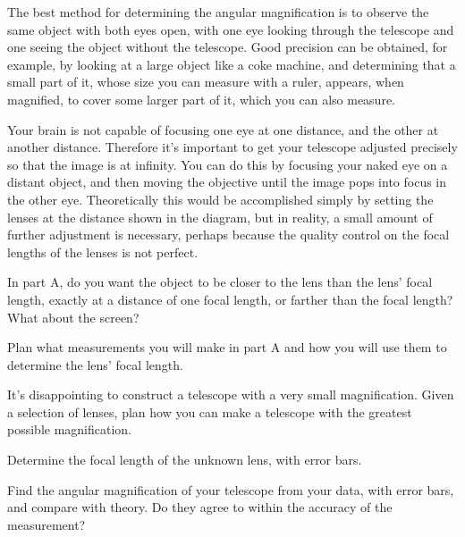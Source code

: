 The best method for determining the angular magnification
is to observe the same object with both eyes open, with one
eye looking through the telescope and one seeing the object
without the telescope. Good precision can be obtained, for
example, by looking at a large object like a coke machine,
and determining that a small part of it, whose size you
can measure with a ruler, appears, when magnified, to cover some larger part
of it, which you can also measure. 

Your brain is not capable of focusing one eye at one distance, and
the other at another distance. Therefore it's important to get your
telescope adjusted precisely so that the image is at infinity.
You can do this by focusing your naked eye on a distant object, and
then moving the objective until the image pops into focus in the
other eye. Theoretically this would be accomplished simply by setting
the lenses at the distance shown in the diagram, but in reality,
a small amount of further adjustment is necessary, perhaps because
the quality control on the focal lengths of the lenses is not perfect.


\prelab

\lasersafety

\prelabquestion  In part A, do you want the object to be closer to the
lens than the lens' focal length, exactly at a distance of
one focal length, or farther than the focal length?
What about the screen?

\prelabquestion  Plan what measurements you will make in part A and how
you will use them to determine the lens' focal length.

\prelabquestion
It's disappointing to construct a telescope with
a very small magnification. Given a selection of lenses, plan
how you can make a telescope with the greatest possible
magnification.

\analysis

Determine the focal length of the unknown lens, with error bars.

Find the angular magnification of your telescope from your
data, with error bars, and compare with theory. Do they
agree to within the accuracy of the measurement?
